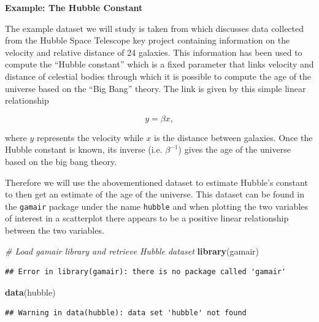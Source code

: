 \documentclass[12pt,]{krantz}
\newenvironment{Shaded}{\begin{snugshade}}{\end{snugshade}}
\newcommand{\KeywordTok}[1]{\textcolor[rgb]{0.27,0.27,0.27}{\textbf{#1}}}
\newcommand{\DataTypeTok}[1]{\textcolor[rgb]{0.27,0.27,0.27}{#1}}
\newcommand{\DecValTok}[1]{\textcolor[rgb]{0.06,0.06,0.06}{#1}}
\newcommand{\StringTok}[1]{\textcolor[rgb]{0.5,0.5,0.5}{#1}}
\newcommand{\CommentTok}[1]{\textcolor[rgb]{0.37,0.37,0.37}{\textit{#1}}}
\newcommand{\OperatorTok}[1]{\textcolor[rgb]{0.43,0.43,0.43}{\textbf{#1}}}
\newcommand{\NormalTok}[1]{#1}
\begin{document}
\textbf{Example: The Hubble Constant}

The example dataset we will study is taken from
\citet{wood2017generalized} which discusses data collected from the
Hubble Space Telescope key project containing information on the
velocity and relative distance of 24 galaxies. This information has been
used to compute the ``Hubble constant'' which is a fixed parameter that
links velocity and distance of celestial bodies through which it is
possible to compute the age of the universe based on the ``Big Bang''
theory. The link is given by this simple linear relationship

\begin{equation*}
  y = \beta x ,
\end{equation*}

where \(y\) represents the velocity while \(x\) is the distance between
galaxies. Once the Hubble constant is known, its inverse (i.e.
\(\beta^{-1}\)) gives the age of the universe based on the big bang
theory.

Therefore we will use the abovementioned dataset to estimate Hubble's
constant to then get an estimate of the age of the universe. This
dataset can be found in the \texttt{gamair} package under the name
\texttt{hubble} and when plotting the two variables of interest in a
scatterplot there appears to be a positive linear relationship between
the two variables.

\begin{Shaded}
\begin{Highlighting}[]
\CommentTok{# Load gamair library and retrieve Hubble dataset}
\KeywordTok{library}\NormalTok{(gamair)}
\end{Highlighting}
\end{Shaded}

\begin{verbatim}
## Error in library(gamair): there is no package called 'gamair'
\end{verbatim}

\begin{Shaded}
\begin{Highlighting}[]
\KeywordTok{data}\NormalTok{(hubble)}
\end{Highlighting}
\end{Shaded}

\begin{verbatim}
## Warning in data(hubble): data set 'hubble' not found
\end{verbatim}

\begin{Shaded}
\end{Shaded}
\end{document}

